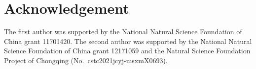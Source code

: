 \documentclass[12pt]{amsart}
\numberwithin{equation}{section}
\theoremstyle{plain}
\theoremstyle{definition}
\begin{document}
\section*{Acknowledgement}
The first author was supported by
the National Natural Science Foundation of China grant 11701420. The second author was supported by the National Natural Science Foundation of China grant 12171059 and the Natural Science Foundation Project of Chongqing (No.~cstc2021jcyj-msxmX0693).
\end{document}
